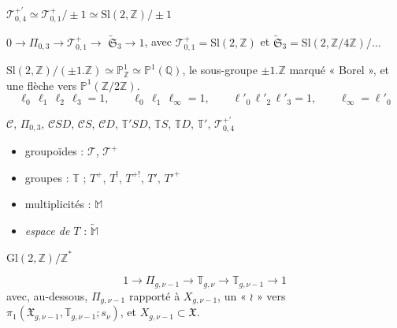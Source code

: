 \documentclass[11pt,a4paper]{article}
\begin{document}

$\mathcal{T}^{+\prime}_{0,4} \simeq \mathcal{T}^{+}_{0,1}/\pm 1 \simeq \mathrm{Sl}(2,\mathbb{Z})/\pm 1$

$0 \to \Pi_{0,3} \to \mathcal{T}^{+}_{0,1} \to$ \struck{\ill{}} $\widetilde{\mathfrak{S}}_3 \to 1$, avec $\mathcal{T}^{+}_{0,1} = \mathrm{Sl}(2,\mathbb{Z})$ et $\widetilde{\mathfrak{S}}_3 = \mathrm{Sl}(2,\mathbb{Z}/4\mathbb{Z})/\ldots$ 

$\mathrm{Sl}(2,\mathbb{Z})/(\pm 1.\mathbb{Z}) \simeq \mathbb{P}^{1}_{\mathbb{Z}} \simeq \mathbb{P}^{1}(\mathbb{Q})$, le sous-groupe $\pm 1.\mathbb{Z}$ marqué « Borel », et une flèche vers $\mathbb{P}^{1}(\mathbb{Z}/2\mathbb{Z})$.
\[
  \ell_0\,\ell_1\,\ell_2\,\ell_3 = 1, \qquad \ell_0\,\ell_1\,\ell_\infty = 1, \qquad \ell'_0\,\ell'_2\,\ell'_3 = 1, \qquad \ell_\infty = \ell'_0
\]

$\mathcal{C}$, \quad $\Pi_{0,3}$, \quad $\mathcal{C}SD$, \quad $\mathcal{C}S$, \quad $\mathcal{C}D$, \quad $\mathbb{T}'SD$, \quad $\mathbb{T}S$, \quad $\mathbb{T}D$, \quad $\mathbb{T}'$, \quad $\mathcal{T}^{+\prime}_{0,4}$

\begin{itemize}
  \item[] groupoïdes : $\mathcal{T}$, $\mathcal{T}^{+}$ \struck{\ill{}}
  \item[] groupes : $\mathbb{T}$ ; $T^{+}$, $T^{!}$, $T^{+!}$, $T'$, $T'^{+}$
  \item[] multiplicités : $\mathbb{M}$
  \item[] \emph{espace de $T$} : $\widetilde{\mathbb{M}}$
\end{itemize}

$\mathrm{Gl}(2,\mathbb{Z})/\mathbb{Z}^{*}$

\[
  1 \to \Pi_{g,\nu-1} \to \mathbb{T}_{g,\nu} \to \mathbb{T}_{g,\nu-1} \to 1
\]
avec, au-dessous, $\Pi_{g,\nu-1}$ rapporté à $X_{g,\nu-1}$, un « $\wr$ » vers $\pi_1(\mathfrak{X}_{g,\nu-1}, \mathbb{T}_{g,\nu-1}; s_\nu)$, et $X_{g,\nu-1} \subset \mathfrak{X}$.
\end{document}
